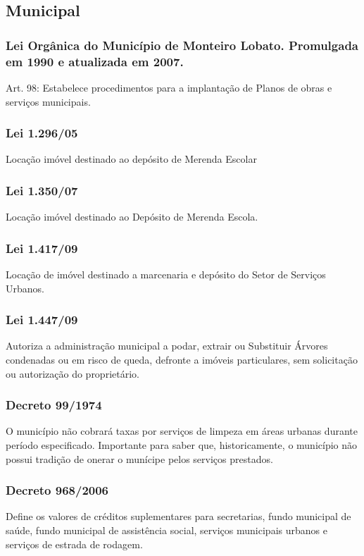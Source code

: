 \begin{subapend}
	\subsection{Municipal}
	\begin{subsubapend}
		\item \subsubsection{Lei Orgânica do Município de Monteiro Lobato. Promulgada em 1990 e atualizada em 2007.}
		Art. 98: Estabelece procedimentos para a implantação de Planos de obras e serviços municipais.
		\subsubsection{Lei 1.296/05}
		Locação imóvel destinado ao depósito de Merenda Escolar
		\subsubsection{Lei 1.350/07}
		Locação imóvel destinado ao Depósito de Merenda Escola. 
		\subsubsection{Lei 1.417/09}
		Locação de imóvel destinado a marcenaria e depósito do Setor de Serviços Urbanos.
		\subsubsection{Lei 1.447/09}
		Autoriza a administração municipal a podar, extrair ou Substituir Árvores condenadas ou em risco de queda, defronte a imóveis particulares, sem solicitação ou autorização do proprietário.
		\subsubsection{Decreto 99/1974}
		O município não cobrará taxas por serviços de limpeza em áreas urbanas durante período especificado. Importante para saber que, historicamente, o município não possui tradição de onerar o munícipe pelos serviços prestados.
		\subsubsection{Decreto 968/2006}
		Define os valores de créditos suplementares para secretarias, fundo municipal de saúde, fundo municipal de assistência social, serviços municipais urbanos e serviços de estrada de rodagem.
	\end{subsubapend}
\end{subapend}

